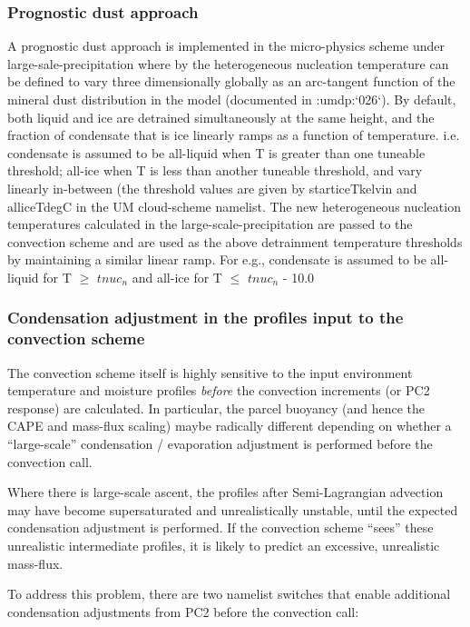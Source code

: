 \documentclass{UMDP_article}
\newcommand{\citeumdp}[1]{:umdp:`#1`}
\begin{document}
\subsubsection{Prognostic dust approach}
A prognostic dust approach is implemented in the micro-physics scheme under
large-sale-precipitation where by the heterogeneous nucleation temperature
can be defined to vary three dimensionally globally as an arc-tangent
function of the mineral dust distribution in the model (documented
in \citeumdp{026}). By default, both liquid and ice are detrained simultaneously at the same
height, and the fraction of condensate that is ice linearly ramps as a function of temperature.
i.e. condensate is assumed to be all-liquid when T is greater than one tuneable threshold; all-ice
when T is less than another tuneable threshold, and vary linearly in-between (the threshold values are
given by starticeTkelvin and alliceTdegC in the UM cloud-scheme namelist. The new heterogeneous
nucleation temperatures calculated in the large-scale-precipitation are passed to the convection
scheme and are used as the above detrainment temperature thresholds by
maintaining a similar linear ramp. For e.g., condensate is
assumed to be all-liquid for T $\geq$ $tnuc_n$ and all-ice for T
$\leq$ $tnuc_n$ - 10.0

\subsubsection{Condensation adjustment in the profiles input to the
convection scheme}
\label{sec:conv_input_profs}

The convection scheme itself is highly sensitive to the input environment
temperature and moisture profiles {\it before} the convection increments
(or PC2 response) are calculated.  In particular, the parcel buoyancy
(and hence the CAPE and mass-flux scaling) maybe radically different
depending on whether a ``large-scale'' condensation / evaporation adjustment
is performed before the convection call.

Where there is large-scale ascent, the profiles after Semi-Lagrangian advection
may have become supersaturated and unrealistically unstable, until the
expected condensation adjustment is performed.  If the convection scheme
``sees'' these unrealistic intermediate profiles, it is likely to
predict an excessive, unrealistic mass-flux.

To address this problem, there are two namelist switches that enable
additional condensation adjustments from PC2 before the convection call:
\end{document}
